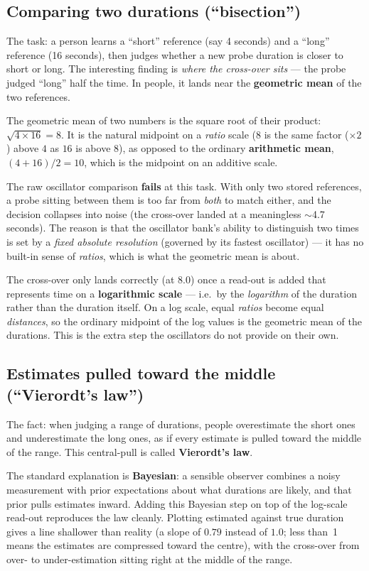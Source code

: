 \documentclass[11pt]{article}
\begin{document}
\subsection{Comparing two durations (``bisection'')}

The task: a person learns a ``short'' reference (say 4 seconds) and a ``long''
reference (16 seconds), then judges whether a new probe duration is closer to short or
long. The interesting finding is \emph{where the cross-over sits} --- the probe judged
``long'' half the time. In people, it lands near the \textbf{geometric mean} of the
two references.

The geometric mean of two numbers is the square root of their product:
$\sqrt{4\times16}=8$. It is the natural midpoint on a \emph{ratio} scale ($8$ is the
same factor ($\times2$) above $4$ as $16$ is above $8$), as opposed to the ordinary
\textbf{arithmetic mean}, $(4+16)/2=10$, which is the midpoint on an additive scale.

The raw oscillator comparison \textbf{fails} at this task. With only two stored
references, a probe sitting between them is too far from \emph{both} to match either,
and the decision collapses into noise (the cross-over landed at a meaningless
$\sim$4.7 seconds). The reason is that the oscillator bank's ability to distinguish
two times is set by a \emph{fixed absolute resolution} (governed by its fastest
oscillator) --- it has no built-in sense of \emph{ratios}, which is what the geometric
mean is about.

The cross-over only lands correctly (at $8.0$) once a read-out is added that
represents time on a \textbf{logarithmic scale} --- i.e.\ by the \emph{logarithm} of
the duration rather than the duration itself. On a log scale, equal \emph{ratios}
become equal \emph{distances}, so the ordinary midpoint of the log values is the
geometric mean of the durations. This is the extra step the oscillators do not provide
on their own.

\subsection{Estimates pulled toward the middle (``Vierordt's law'')}

The fact: when judging a range of durations, people overestimate the short ones and
underestimate the long ones, as if every estimate is pulled toward the middle of the
range. This central-pull is called \textbf{Vierordt's law}.

The standard explanation is \textbf{Bayesian}: a sensible observer combines a noisy
measurement with prior expectations about what durations are likely, and that prior
pulls estimates inward. Adding this Bayesian step on top of the log-scale read-out
reproduces the law cleanly. Plotting estimated against true duration gives a line
shallower than reality (a slope of $0.79$ instead of $1.0$; less than~1 means the
estimates are compressed toward the centre), with the cross-over from over- to
under-estimation sitting right at the middle of the range.
\end{document}
